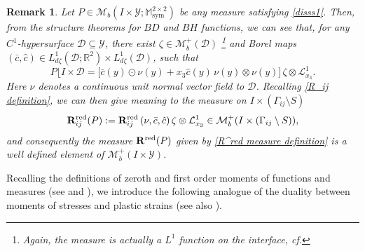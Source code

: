 \documentclass[reqno,10pt]{amsart}
\numberwithin{equation}{section}
\newtheorem{remark}[theorem]{Remark}
\theoremstyle{remark}
\newcommand{\RED}{\color{black}}
\newcommand{\BLACK}{\color{black}}
\newcommand{\calD}{\mathcal{D}}
\newcommand{\calL}{\mathcal{L}}
\newcommand{\M}{\mathbb{M}}
\newcommand{\R}{\mathbb{R}}
\newcommand{\calY}{\mathcal{Y}}
\DeclareMathOperator{\sym}{sym}
\newcommand{\Mb}{\mathcal{M}_b}
\newcommand{\mres}[1]{\lfloor{#1}}
\newcommand{\disspot}{\mathbf{R}}
\begin{document}
\begin{remark} \label{dissipation on acell} 
Let $P \in \Mb(I \times \calY;\M^{2 \times 2}_{\sym})$ be any measure satisfying \eqref{disss1}. 
Then, from the structure theorems for $BD$ and $BH$ functions, we can see that, for any $C^1$-hypersurface $\calD \subseteq \calY$, there exist $\zeta \in \Mb^+(\calD)$ \footnote{Again{\RED,\BLACK}  the measure is actually {\RED a\BLACK} $L^1$ function on the interface, cf. \Cref{marinrem}{\RED.\BLACK}} and Borel maps $(\bar{c}, \hat{c}) \in L^1_{d\zeta}(\calD;\R^2) \times L^1_{d\zeta}(\calD)$, such that
\begin{equation} \label{P form on the interface without x'}
	P\mres{I \times \calD} = \big[ \bar{c}(y) \odot \nu(y) + x_3 \hat{c}(y) \, \nu(y) \otimes \nu(y) \big]\,\zeta \otimes \calL_{x_3}^1.
\end{equation}
Here $\nu$ denotes a continuous unit normal vector field to $\calD$. 
Recalling \eqref{R_ij definition}, we can then give meaning to the measure on $I \times (\Gamma_{ij} \setminus S)$ 
\begin{align*}
	\disspot_{ij}^{\rm red}(P) := \disspot_{ij}^{\rm red}\left(\nu,\bar{c},\hat{c}\right) \zeta \otimes \calL_{x_3}^1 \in \Mb^+(I \times (\Gamma_{ij} \setminus S)), 
\end{align*}
and consequently the measure $\disspot^{\rm red}(P)$ given by \eqref{R^red measure definition} is a well defined element of $\Mb^+(I \times \calY)$.
\end{remark}

Recalling the definitions of zeroth and first order moments of functions and measures (see  and ), we introduce the following analogue of the duality between moments of stresses and plastic strains (see also \cite{Buzancic.Davoli.Velcic.2024.2nd}). 
\end{document}
